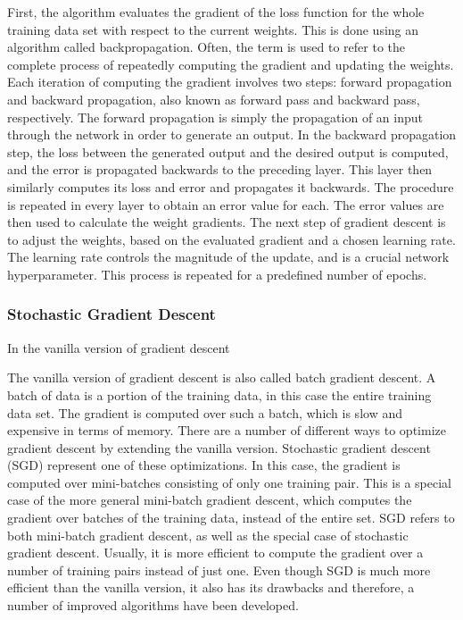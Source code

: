 
\noindent First, the algorithm evaluates the gradient of the loss function for the whole training data set with respect to the current weights. This is done using an algorithm called backpropagation. Often, the term is used to refer to the complete process of repeatedly computing the gradient and updating the weights. Each iteration of computing the gradient involves two steps: forward propagation and backward propagation, also known as forward pass and backward pass, respectively. The forward propagation is simply the propagation of an input through the network in order to generate an output. In the backward propagation step, the loss between the generated output and the desired output is computed, and the error is propagated backwards to the preceding layer. This layer then similarly computes its loss and error and propagates it backwards. The procedure is repeated in every layer to obtain an error value for each. The error values are then used to calculate the weight gradients. The next step of gradient descent is to adjust the weights, based on the evaluated gradient and a chosen learning rate. The learning rate controls the magnitude of the update, and is a crucial network hyperparameter. This process is repeated for a predefined number of epochs.

\subsubsection{Stochastic Gradient Descent}

In the vanilla version of gradient descent %


The vanilla version of gradient descent is also called batch gradient descent. A batch of data is a portion of the training data, in this case the entire training data set. The gradient is computed over such a batch, which is slow and expensive in terms of memory. There are a number of different ways to optimize gradient descent by extending the vanilla version. Stochastic gradient descent (SGD) represent one of these optimizations. In this case, the gradient is computed over mini-batches consisting of only one training pair. This is a special case of the more general mini-batch gradient descent, which computes the gradient over batches of the training data, instead of the entire set. SGD refers to both mini-batch gradient descent, as well as the special case of stochastic gradient descent. Usually, it is more efficient to compute the gradient over a number of training pairs instead of just one. Even though SGD is much more efficient than the vanilla version, it also has its drawbacks and therefore, a number of improved algorithms have been developed.

